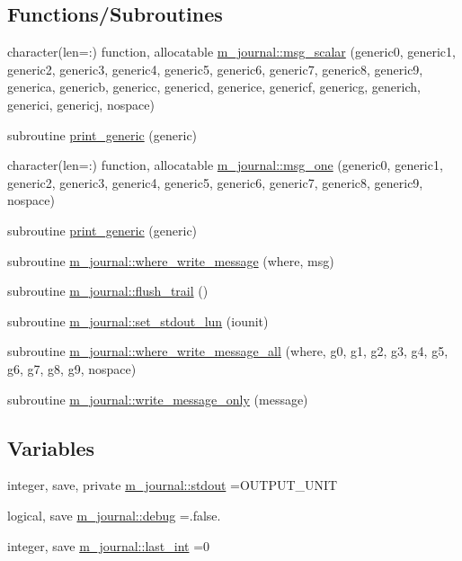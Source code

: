 \subsection*{Functions/\+Subroutines}
\begin{DoxyCompactItemize}
\item 
character(len=\+:) function, allocatable \mbox{\hyperlink{namespacem__journal_a7906bba242b412d6941f4b32233b7eca}{m\+\_\+journal\+::msg\+\_\+scalar}} (generic0, generic1, generic2, generic3, generic4, generic5, generic6, generic7, generic8, generic9, generica, genericb, genericc, genericd, generice, genericf, genericg, generich, generici, genericj, nospace)
\item 
subroutine \mbox{\hyperlink{M__journal_8f90_aaa8ee15f943d8e1543ae35ab732c3cd2}{print\+\_\+generic}} (generic)
\item 
character(len=\+:) function, allocatable \mbox{\hyperlink{namespacem__journal_a1b516ae6ba2da17e10847cf68d6833b1}{m\+\_\+journal\+::msg\+\_\+one}} (generic0, generic1, generic2, generic3, generic4, generic5, generic6, generic7, generic8, generic9, nospace)
\item 
subroutine \mbox{\hyperlink{M__journal_8f90_a9d5e1620d474ac03a74eeb9b0f7d6ae1}{print\+\_\+generic}} (generic)
\item 
subroutine \mbox{\hyperlink{namespacem__journal_a21238c3fc7731703c75eb39233ab529e}{m\+\_\+journal\+::where\+\_\+write\+\_\+message}} (where, msg)
\item 
subroutine \mbox{\hyperlink{namespacem__journal_a24b891eded8ca585a6a72ab0eef7016c}{m\+\_\+journal\+::flush\+\_\+trail}} ()
\item 
subroutine \mbox{\hyperlink{namespacem__journal_a8388800481a5e7ca022b52cfc56b9daf}{m\+\_\+journal\+::set\+\_\+stdout\+\_\+lun}} (iounit)
\item 
subroutine \mbox{\hyperlink{namespacem__journal_a25d0f5da7f7e84e22ab0a583447412b1}{m\+\_\+journal\+::where\+\_\+write\+\_\+message\+\_\+all}} (where, g0, g1, g2, g3, g4, g5, g6, g7, g8, g9, nospace)
\item 
subroutine \mbox{\hyperlink{namespacem__journal_aa86511a7c388f9286c282f6fa933ab58}{m\+\_\+journal\+::write\+\_\+message\+\_\+only}} (message)
\end{DoxyCompactItemize}
\subsection*{Variables}
\begin{DoxyCompactItemize}
\item 
integer, save, private \mbox{\hyperlink{namespacem__journal_a664cf3fd85385b776d30ea589606ad1c}{m\+\_\+journal\+::stdout}} =O\+U\+T\+P\+U\+T\+\_\+\+U\+N\+IT
\item 
logical, save \mbox{\hyperlink{namespacem__journal_a6184fbcebdfa06f0a45ce4c699189b53}{m\+\_\+journal\+::debug}} =.false.
\item 
integer, save \mbox{\hyperlink{namespacem__journal_a47e8e34dc4072b04101027394d688519}{m\+\_\+journal\+::last\+\_\+int}} =0
\end{DoxyCompactItemize}


